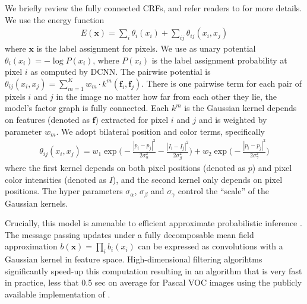 We briefly review the fully connected CRFs, and refer readers to
\citep{krahenbuhl2011efficient} for more details. We use the energy function
\begin{align}
  E(\boldsymbol{x}) = \sum_i \theta_i(x_i) + \sum_{ij} \theta_{ij}(x_i, x_j)
\end{align}
where $\boldsymbol{x}$ is the label assignment for pixels. We use as unary
potential $\theta_i(x_i) = - \log P(x_i)$, where $P(x_i)$ is the label
assignment probability at pixel $i$ as computed by DCNN. The pairwise
potential is $\theta_{ij}(x_i, x_j) = \sum_{m=1}^{K} w_m \cdot
k^m(\boldsymbol{f}_i, \boldsymbol{f}_j)$. There is one pairwise term for each
pair of pixels $i$ and $j$ in the image no matter how far from each other they
lie, \ie the model's factor graph is fully connected. Each $k^m$ is the
Gaussian kernel depends on features (denoted as $\boldsymbol{f}$) extracted for pixel $i$ and $j$ and is
weighted by parameter $w_m$. We adopt bilateral position and color terms,
specifically
\begin{align}
  \label{eq:fully_crf}
  \theta_{ij}(x_i, x_j) = w_1 \exp \Big(-\frac{|p_i-p_j|^2}{2\sigma_\alpha^2} -\frac{|I_i-I_j|^2}{2\sigma_\beta^2} \Big) + w_2 \exp \Big(-\frac{|p_i-p_j|^2}{2\sigma_\gamma^2}\Big)
\end{align}
where the first kernel depends on both pixel positions (denoted as $p$) and
pixel color intensities (denoted as $I$), and the second kernel only depends
on pixel positions. The hyper parameters $\sigma_\alpha$, $\sigma_\beta$ and
$\sigma_\gamma$ control the ``scale'' of the Gaussian kernels.

Crucially, this model is amenable to efficient approximate probabilistic
inference \citep{krahenbuhl2011efficient}. The message passing updates under a
fully decomposable mean field approximation $b(\boldsymbol{x}) = \prod_i
b_i(x_i)$ can be expressed as convolutions with a Gaussian kernel in feature
space. High-dimensional filtering algorihtms \citep{adams2010fast}
significantly speed-up this computation resulting in an algorithm that is very
fast in practice, less that 0.5 sec on average for Pascal VOC images using the
publicly available implementation of \citep{krahenbuhl2011efficient}.

